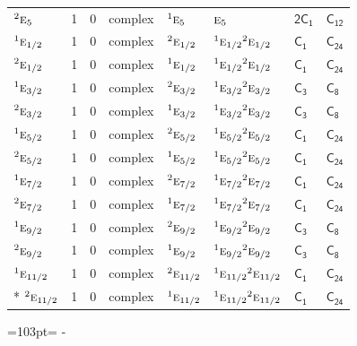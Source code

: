 \documentclass[10pt,a4paper]{article}
\makeatletter
\def\grouprule#1#2{\noalign{\marks\LTgroupmarks{\the\belowrulesep}\nobreak\vskip#1%
  \vskip\aboverulesep}\multispan\LT@cols\unskip{\leaders\hrule\@height#2\hfill\kern\z@}\cr
  \noalign{\penalty\LTrulebreak\vskip\belowrulesep\global\@lastruleclass\z@}}
\newcommand{\needspace}[1]{\par\penalty-100\begingroup\dimen0=#1\relax\dimen2=\pagegoal
  \advance\dimen2-\pagetotal\ifdim\dimen0>\dimen2\relax\ifdim\dimen2>0pt\vfil\break\fi\fi
  \endgroup}
\numberwithin{equation}{section}
\newcommand{\grp}[1]{\mathsf{#1}}
\newcommand{\irr}[1]{\text{\normalfont\scshape #1}}
\newcommand{\conjpair}[1]{{}^{#1}}
\makeatother
\begin{document}
{\begin{longtable}{@{}lrrlllll@{}}
$\conjpair{2}\irr{e}_{5}$ & 1 & $0$ & complex & $\conjpair{1}\irr{e}_{5}$ & $\irr{e}_{5}$ & \href{2C1.pdf}{$\grp{2C_{1}}$} & \href{../../../rotation/data/pdf/C12.pdf}{$\grp{C_{12}}$}\\
\grouprule{0pt}{\lightrulewidth}
$\conjpair{1}\irr{e}_{1/2}$ & 1 & $0$ & complex & $\conjpair{2}\irr{e}_{1/2}$ & $\conjpair{1}\irr{e}_{1/2}\conjpair{2}\irr{e}_{1/2}$ & \href{C1.pdf}{$\grp{C_{1}}$} & $\grp{C_{24}}$\\
$\conjpair{2}\irr{e}_{1/2}$ & 1 & $0$ & complex & $\conjpair{1}\irr{e}_{1/2}$ & $\conjpair{1}\irr{e}_{1/2}\conjpair{2}\irr{e}_{1/2}$ & \href{C1.pdf}{$\grp{C_{1}}$} & $\grp{C_{24}}$\\
$\conjpair{1}\irr{e}_{3/2}$ & 1 & $0$ & complex & $\conjpair{2}\irr{e}_{3/2}$ & $\conjpair{1}\irr{e}_{3/2}\conjpair{2}\irr{e}_{3/2}$ & \href{C3.pdf}{$\grp{C_{3}}$} & \href{../../../rotation/data/pdf/C8.pdf}{$\grp{C_{8}}$}\\
$\conjpair{2}\irr{e}_{3/2}$ & 1 & $0$ & complex & $\conjpair{1}\irr{e}_{3/2}$ & $\conjpair{1}\irr{e}_{3/2}\conjpair{2}\irr{e}_{3/2}$ & \href{C3.pdf}{$\grp{C_{3}}$} & \href{../../../rotation/data/pdf/C8.pdf}{$\grp{C_{8}}$}\\
$\conjpair{1}\irr{e}_{5/2}$ & 1 & $0$ & complex & $\conjpair{2}\irr{e}_{5/2}$ & $\conjpair{1}\irr{e}_{5/2}\conjpair{2}\irr{e}_{5/2}$ & \href{C1.pdf}{$\grp{C_{1}}$} & $\grp{C_{24}}$\\
$\conjpair{2}\irr{e}_{5/2}$ & 1 & $0$ & complex & $\conjpair{1}\irr{e}_{5/2}$ & $\conjpair{1}\irr{e}_{5/2}\conjpair{2}\irr{e}_{5/2}$ & \href{C1.pdf}{$\grp{C_{1}}$} & $\grp{C_{24}}$\\
$\conjpair{1}\irr{e}_{7/2}$ & 1 & $0$ & complex & $\conjpair{2}\irr{e}_{7/2}$ & $\conjpair{1}\irr{e}_{7/2}\conjpair{2}\irr{e}_{7/2}$ & \href{C1.pdf}{$\grp{C_{1}}$} & $\grp{C_{24}}$\\
$\conjpair{2}\irr{e}_{7/2}$ & 1 & $0$ & complex & $\conjpair{1}\irr{e}_{7/2}$ & $\conjpair{1}\irr{e}_{7/2}\conjpair{2}\irr{e}_{7/2}$ & \href{C1.pdf}{$\grp{C_{1}}$} & $\grp{C_{24}}$\\
$\conjpair{1}\irr{e}_{9/2}$ & 1 & $0$ & complex & $\conjpair{2}\irr{e}_{9/2}$ & $\conjpair{1}\irr{e}_{9/2}\conjpair{2}\irr{e}_{9/2}$ & \href{C3.pdf}{$\grp{C_{3}}$} & \href{../../../rotation/data/pdf/C8.pdf}{$\grp{C_{8}}$}\\
$\conjpair{2}\irr{e}_{9/2}$ & 1 & $0$ & complex & $\conjpair{1}\irr{e}_{9/2}$ & $\conjpair{1}\irr{e}_{9/2}\conjpair{2}\irr{e}_{9/2}$ & \href{C3.pdf}{$\grp{C_{3}}$} & \href{../../../rotation/data/pdf/C8.pdf}{$\grp{C_{8}}$}\\
$\conjpair{1}\irr{e}_{11/2}$ & 1 & $0$ & complex & $\conjpair{2}\irr{e}_{11/2}$ & $\conjpair{1}\irr{e}_{11/2}\conjpair{2}\irr{e}_{11/2}$ & \href{C1.pdf}{$\grp{C_{1}}$} & $\grp{C_{24}}$\\*
$\conjpair{2}\irr{e}_{11/2}$ & 1 & $0$ & complex & $\conjpair{1}\irr{e}_{11/2}$ & $\conjpair{1}\irr{e}_{11/2}\conjpair{2}\irr{e}_{11/2}$ & \href{C1.pdf}{$\grp{C_{1}}$} & $\grp{C_{24}}$\\
\bottomrule\end{longtable}}
\needspace{103pt}
\end{document}
